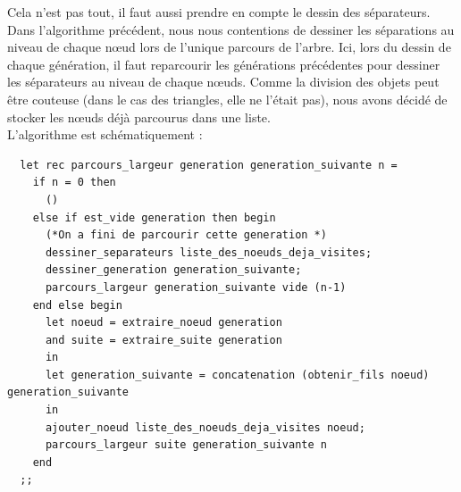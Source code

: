 \documentclass[a4paper,11pt]{article}
\begin{document}
Cela n'est pas tout, il faut aussi prendre en compte le dessin des séparateurs. Dans
l'algorithme précédent, nous nous contentions de dessiner les séparations au niveau de chaque
nœud lors de l'unique parcours de l'arbre. Ici, lors du dessin de chaque génération, il
faut reparcourir les générations précédentes pour dessiner les séparateurs au niveau de
chaque nœuds. Comme la division des objets peut être couteuse (dans le cas des triangles, elle
ne l'était pas), nous avons décidé de stocker les nœuds déjà parcourus dans une liste.\\

L'algorithme est schématiquement :

\begin{lstlisting}
  let rec parcours_largeur generation generation_suivante n =
    if n = 0 then
      ()
    else if est_vide generation then begin
      (*On a fini de parcourir cette generation *)
      dessiner_separateurs liste_des_noeuds_deja_visites;
      dessiner_generation generation_suivante;
      parcours_largeur generation_suivante vide (n-1)
    end else begin
      let noeud = extraire_noeud generation
      and suite = extraire_suite generation
      in
      let generation_suivante = concatenation (obtenir_fils noeud) generation_suivante
      in
      ajouter_noeud liste_des_noeuds_deja_visites noeud;
      parcours_largeur suite generation_suivante n
    end
  ;;
\end{lstlisting}
\end{document}
